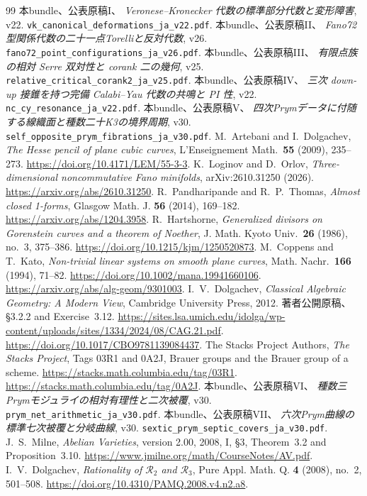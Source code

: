 \begin{thebibliography}{99}
 本bundle、公表原稿I、
\emph{Veronese--Kronecker 代数の標準部分代数と変形障害}, v22.
\nolinkurl{vk_canonical_deformations_ja_v22.pdf}.
 本bundle、公表原稿II、
\emph{Fano72型関係代数の二十一点Torelliと反対代数}, v26.
\nolinkurl{fano72_point_configurations_ja_v26.pdf}.
 本bundle、公表原稿III、
\emph{有限点族の相対 Serre 双対性と corank 二の幾何}, v25.
\nolinkurl{relative_critical_corank2_ja_v25.pdf}.
 本bundle、公表原稿IV、
\emph{三次 down-up 接錐を持つ完備 Calabi--Yau 代数の共鳴と PI 性}, v22.
\nolinkurl{nc_cy_resonance_ja_v22.pdf}.
 本bundle、公表原稿V、
\emph{四次Prymデータに付随する線織面と種数二十K3の境界周期}, v30.
\nolinkurl{self_opposite_prym_fibrations_ja_v30.pdf}.
M.~Artebani and I.~Dolgachev, \emph{The Hesse pencil of plane cubic curves},
L'Enseignement Math.\ \textbf{55} (2009), 235--273.
\url{https://doi.org/10.4171/LEM/55-3-3}.
 K.~Loginov and D.~Orlov,
\emph{Three-dimensional noncommutative Fano minifolds}, arXiv:2610.31250 (2026).
\url{https://arxiv.org/abs/2610.31250}.
 R.~Pandharipande and R.~P.~Thomas,
\emph{Almost closed 1-forms}, Glasgow Math. J. \textbf{56} (2014), 169--182.
\url{https://arxiv.org/abs/1204.3958}.
R.~Hartshorne, \emph{Generalized divisors on Gorenstein curves and a theorem of Noether},
J. Math. Kyoto Univ.\ \textbf{26} (1986), no.~3, 375--386.
\url{https://doi.org/10.1215/kjm/1250520873}.
M.~Coppens and T.~Kato, \emph{Non-trivial linear systems on smooth plane curves},
Math. Nachr.\ \textbf{166} (1994), 71--82.
\url{https://doi.org/10.1002/mana.19941660106}.
\url{https://arxiv.org/abs/alg-geom/9301003}.
I.~V.~Dolgachev, \emph{Classical Algebraic Geometry: A Modern View},
Cambridge University Press, 2012.
著者公開原稿、\S3.2.2 and Exercise~3.12.
\url{https://sites.lsa.umich.edu/idolga/wp-content/uploads/sites/1334/2024/08/CAG.21.pdf}.
\url{https://doi.org/10.1017/CBO9781139084437}.
The Stacks Project Authors, \emph{The Stacks Project},
Tags 03R1 and 0A2J, Brauer groups and the Brauer group of a scheme.
\url{https://stacks.math.columbia.edu/tag/03R1}.
\url{https://stacks.math.columbia.edu/tag/0A2J}.
 本bundle、公表原稿VI、
\emph{種数三Prymモジュライの相対有理性と二次被覆}, v30.
\nolinkurl{prym_net_arithmetic_ja_v30.pdf}.
 本bundle、公表原稿VII、
\emph{六次Prym曲線の標準七次被覆と分岐曲線}, v30.
\nolinkurl{sextic_prym_septic_covers_ja_v30.pdf}.
J.~S.~Milne, \emph{Abelian Varieties}, version 2.00, 2008,
I, \S3, Theorem~3.2 and Proposition~3.10.
\url{https://www.jmilne.org/math/CourseNotes/AV.pdf}.
I.~V.~Dolgachev, \emph{Rationality of $\mathcal R_2$ and $\mathcal R_3$},
Pure Appl. Math. Q. \textbf{4} (2008), no.~2, 501--508.
\url{https://doi.org/10.4310/PAMQ.2008.v4.n2.a8}.


\end{thebibliography}
